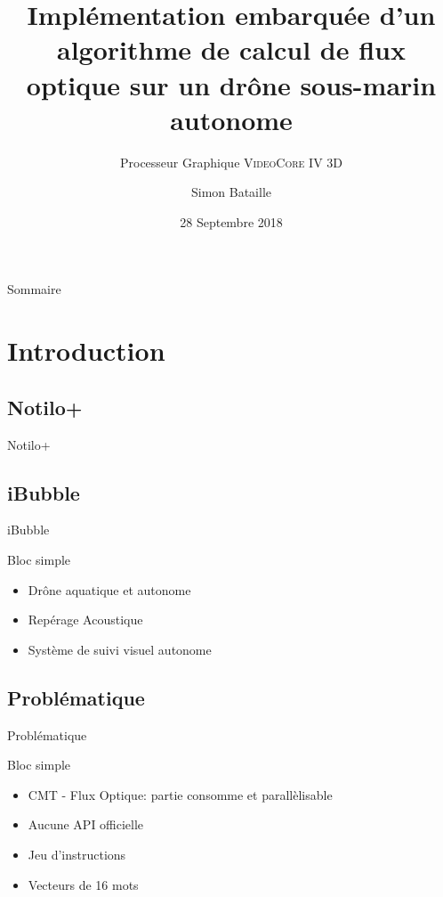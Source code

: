 \documentclass{bredelebeamer}
\title[Calcul du flux optique sur Raspbery Pi]{Implémentation embarquée d'un algorithme de calcul de flux optique sur un dr\^one sous-marin autonome}
\subtitle{Processeur Graphique \textsc{VideoCore IV 3D}}
\author{Simon Bataille\inst{1}}
\institute[Université de Caen Normandie]
{
  \inst{1}%
  ESIX NORMANDIE\\
  Département Mécatronique \& Systèmes Nomades
  }
\date{28 Septembre 2018}
\begin{document}
\begin{frame}
  \titlepage
\end{frame}





\begin{frame}{Sommaire}
  \tableofcontents
\end{frame}




\section{Introduction}
	\subsection{Notilo+}

\begin{frame}{Notilo+}
\end{frame}

	\subsection{iBubble}
\begin{frame}{iBubble}
\begin{block}{Bloc simple}
\begin{itemize}
\item Dr\^one aquatique et autonome
\item Repérage Acoustique
\item Système de suivi visuel autonome
\end{itemize}
\end{block}
\end{frame}

	\subsection{Problématique}
\begin{frame}{Problématique}
\begin{block}{Bloc simple}
\begin{itemize}
\item CMT - Flux Optique: partie consomme et parallèlisable
\item Aucune API officielle
\item Jeu d'instructions
\item Vecteurs de 16 mots
\end{itemize}
\end{block}
\end{frame}
\end{document}
